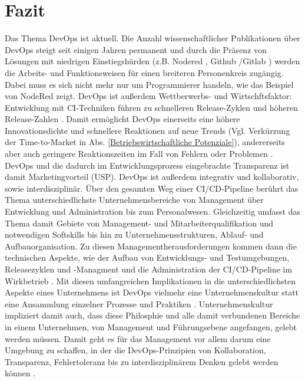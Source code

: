 \section{Fazit}
\label{Fazit}
Das Thema \gls{DevOps} ist aktuell. Die Anzahl wissenschaftlicher Publikationen über \gls{DevOps} steigt seit einigen Jahren permanent \cite{leite_survey_2020} und durch die Präsenz von Lösungen mit niedrigen Einstiegshürden (z.B. Nodered \cite{nodered_about}, Github \cite{DevOps_Definition_Microsoft}/Gitlab \cite{gitlab_devops}) werden die Arbeits- und Funktionsweisen für einen breiteren Personenkreis zugängig. Dabei muss es sich nicht mehr nur um Programmierer handeln, wie das Beispiel von NodeRed zeigt.
\gls{DevOps} ist außerdem Wettberwerbs- und Wirtschftsfaktor: Entwicklung mit \acrshort{CI}-Techniken führen zu schnelleren Release-Zyklen und höheren Release-Zahlen \cite{forsgren_devops_2015} \cite{hilton_usage_2016}. Damit ermöglicht \gls{DevOps} einerseits eine höhere Innovationsdichte und schnellere Reaktionen auf neue Trends (Vgl. Verkürzung der \gls{Time-to-Market} in Abs. \ref{Betriebswirtschaftliche Potenziale}), andererseits aber auch geringere Reaktionszeiten im Fall von Fehlern oder Problemen \cite{zhao_impact_2017}. \gls{DevOps} und die dadurch im Entwicklungsprozess eingebrachte Transparenz ist damit Marketingvorteil (\acrshort{USP}).
\gls{DevOps} ist außerdem integrativ und kollaborativ, sowie interdisziplinär. Über den gesamten Weg einer \acrshort{CI}/\acrshort{CD}-Pipeline berührt das Thema unterschiedlichste Unternehmensbereiche von Management über Entwicklung und Administration bis zum Personalwesen. Gleichzeitig umfasst das Thema damit Gebiete von Management- und Mitarbeiterqualifikation und notwendigen Softskills bis hin zu Unternehmensstrukturen, Ablauf- und Aufbauorganisation. Zu diesen Managementherausforderungen kommen dann die technischen Aspekte, wie der Aufbau von Entwicklungs- und Testumgebungen, Releasezyklen und -Managment und die Administration der \acrshort{CI}/\acrshort{CD}-Pipeline im Wirkbetrieb \cite[Abb. 5 bis 8]{leite_survey_2020}. 
Mit diesen umfangreichen Implikationen in die unterschiedlichsten Aspekte eines Unternehmens ist  \gls{DevOps} vielmehr eine Unternehmenskultur statt eine Ansammlung einzelner Prozesse und Praktiken \cite{DevOps_Definition_Microsoft} \cite{DevOps_Definition_AWS}. Unternehmenskultur impliziert damit auch, dass diese Philosphie und alle damit verbundenen Bereiche in einem Unternehmen, von Management und Führungsebene angefangen, gelebt werden müssen. Damit geht es für das Management vor allem darum eine Umgebung zu schaffen, in der die \gls{DevOps}-Prinzipien von Kollaboration, Transparenz, Fehlertoleranz bis zu interdisziplinärem Denken gelebt werden können \cite[Abschnitt 7.2]{leite_survey_2020}.
